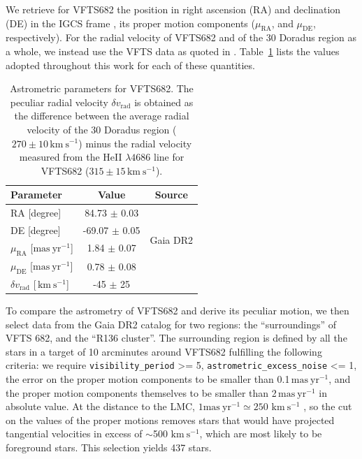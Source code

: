 \documentclass{aa}
\newcommand{\kms}{{\,\mathrm{km\ s^{-1}}}}
\DeclareRobustCommand{\Tabref}[1]{Table~\ref{#1}}
\begin{document}

We retrieve for VFTS682 the position in right ascension (RA) and declination (DE)
in the IGCS frame \cite[][]{brown:18}, its
proper motion components ($\mu_\mathrm{RA}$, and $\mu_\mathrm{DE}$,
respectively). For the radial velocity of VFTS682 and of the 30 Doradus
region as a whole, we instead use the VFTS data
as quoted in \cite{bestenlehner:11}. \Tabref{tab:vfts682} lists the values adopted throughout
this work for each of these quantities.

\begin{table}[tbp]
  \centering
    \caption{Astrometric parameters for VFTS682. The peculiar radial
    velocity $\delta v_\mathrm{rad}$ is obtained as the difference
    between the average radial velocity of the 30 Doradus region
    ($270\pm10\kms$) minus the radial velocity measured from the HeII $\lambda4686$
    line for VFTS682 ($315\pm15\kms$).}

  \begin{tabular}[htbp]{l|c|c}
    Parameter & Value & Source\\ \hline\hline
    RA \hfill[degree] &  \phantom{-}84.73 $\pm$  0.03 & \multirow{4}{*}{Gaia DR2}\\
    DE \hfill [degree] & -69.07 $\pm$  0.05  & \\
    $\mu_\mathrm{RA}$  \hfill[$\mathrm{mas\ yr^{-1}}$] & \phantom{-0}1.84 $\pm$ 0.07 & \\
    $\mu_\mathrm{DE}$  \hfill[$\mathrm{mas\ yr^{-1}}$] & \phantom{-0}0.78 $\pm$ 0.08& \\
    $\delta v_\mathrm{rad}$  \hfill[$\kms$] & \phantom{0}-45 $\pm$ 25 & \cite{bestenlehner:11}\\
    \hline
  \end{tabular}
  \label{tab:vfts682}
\end{table}

To compare the astrometry of VFTS682 and derive its peculiar motion,
we then select data from the Gaia DR2 catalog for two regions: the
``surroundings'' of VFTS 682, and the ``R136 cluster''. The
surrounding region is defined by all the stars in a target of 10 arcminutes around
VFTS682 fulfilling the following criteria: we require \texttt{visibility\_period} >= 5,
\texttt{astrometric\_excess\_noise} <= 1, the error on the proper
motion components to be smaller than 0.1\,$\mathrm{mas\ yr^{-1}}$,
and the proper motion components themselves to be smaller than
2\,$\mathrm{mas\ yr^{-1}}$ in absolute value. At the distance to the
LMC, $1\mathrm{mas\ yr^{-1}}\simeq250\,\kms$ \citep[e.g.,][]{lennon:18}, so the cut on the values
of the proper motions removes stars that would have projected
tangential velocities in excess of $\sim$500\,$\kms$, which are most
likely to be foreground stars.
This selection yields 437 stars.
\end{document}
